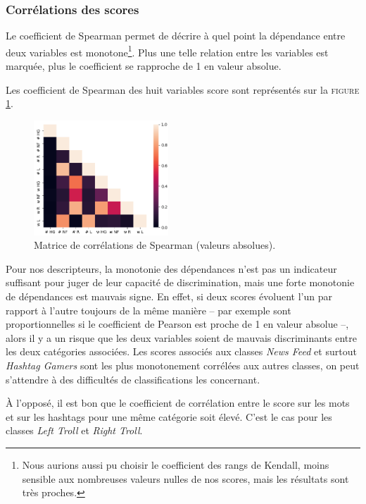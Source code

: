 \documentclass[twocolumn,10pt]{article}
\begin{document}
\subsubsection{Corrélations des scores}

Le coefficient de Spearman permet de décrire à quel point la dépendance entre deux variables est monotone\footnote{Nous aurions aussi pu choisir le coefficient des rangs de Kendall, moins sensible aux nombreuses valeurs nulles de nos scores, mais les résultats sont très proches.}. Plus une telle relation entre les variables est marquée, plus le coefficient se rapproche de 1 en valeur absolue.

Les coefficient de Spearman des huit variables score sont représentés sur la \textsc{figure} \ref{fig:MCS}.

\begin{figure}[h]
\begin{center}
\caption{\label{fig:MCS}Matrice de corrélations de Spearman (valeurs absolues).}
\includegraphics[width=0.45\textwidth]{Ressources/matrice_correlations.png}
\end{center}
\end{figure}

Pour nos descripteurs, la monotonie des dépendances n'est pas un indicateur suffisant pour juger de leur capacité de discrimination, mais une forte monotonie de dépendances est mauvais signe. En effet, si deux scores évoluent l'un par rapport à l'autre toujours de la même manière -- par exemple sont proportionnelles si le coefficient de Pearson est proche de 1 en valeur absolue --, alors il y a un risque que les deux variables soient de mauvais discriminants entre les deux catégories associées. Les scores associés aux classes \textit{News Feed} et surtout \textit{Hashtag Gamers} sont les plus monotonement corrélées aux autres classes, on peut s'attendre à des difficultés de classifications les concernant.

À l'opposé, il est bon que le coefficient de corrélation entre le score sur les mots et sur les hashtags pour une même catégorie soit élevé. C'est le cas pour les classes \textit{Left Troll} et \textit{Right Troll}.
\end{document}
